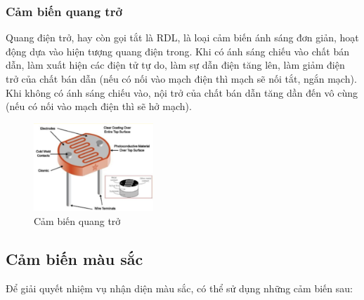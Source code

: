         \subsubsection{Cảm biến quang trở}
            \hspace*{0.6cm}Quang điện trở, hay còn gọi tắt là RDL, là loại cảm biến ánh sáng đơn giản, hoạt động
                dựa vào hiện tượng quang điện trong. \newline
            \hspace*{0.6cm} Khi có ánh sáng chiếu vào chất bán dẫn, làm xuất hiện các điện tử tự do, làm sự
                dẫn điện tăng lên, làm giảm điện trở của chất bán dẫn (nếu có nối vào mạch điện thì
                mạch sẽ nối tắt, ngắn mạch). Khi không có ánh sáng chiếu vào, nội trở của chất bán dẫn
                tăng dần đến vô cùng (nếu có nối vào mạch điện thì sẽ hở mạch).
            \begin{figure}[H]
                \centering
                \includegraphics[width=0.4\textwidth]{pictures/chapter1/chapter1_pic16a_photoresistor.png}
                \caption{Cảm biến quang trở}
                \label{chap1_pic16}
            \end{figure}     

        \subsection{Cảm biến màu sắc}
            \hspace*{0.6cm}Để giải quyết nhiệm vụ nhận diện màu sắc, có thể sử dụng những cảm biến sau:

